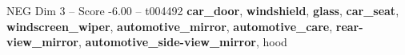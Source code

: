 \begin{textsample}{NEG Dim 3 – Score -6.00 – t004492}  \label{ex:f3_neg_022}
\textbf{car\_door}, \textbf{windshield}, \textbf{glass}, \textbf{car\_seat}, \textbf{windscreen\_wiper}, \textbf{automotive\_mirror}, \textbf{automotive\_care}, \textbf{rear-view\_mirror}, \textbf{automotive\_side-view\_mirror}, hood

\end{textsample}
